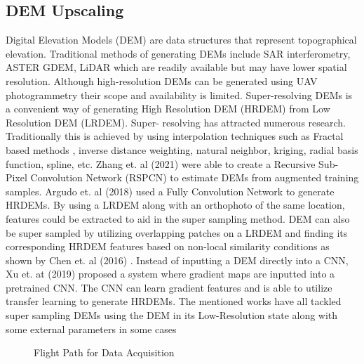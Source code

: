 \documentclass[conference]{IEEEtran}
\begin{document}
\subsection{DEM Upscaling}
Digital Elevation Models (DEM) are data structures that
represent topographical elevation. Traditional methods of
generating DEMs include SAR interferometry, ASTER
GDEM, LiDAR which are readily available but may have
lower spatial resolution. Although high-resolution DEMs
can be generated using UAV photogrammetry their scope
and availability is limited. Super-resolving DEMs is a
convenient way of generating High Resolution DEM
(HRDEM) from Low Resolution DEM (LRDEM). Super-
resolving has attracted numerous research. Traditionally this
is achieved by using interpolation techniques such as Fractal
based methods \cite{322050}, inverse distance weighting, natural
neighbor, kriging, radial basis function, spline, etc. Zhang
et. al (2021) \cite{ijgi10080501} were able to create a Recursive Sub-Pixel
Convolution Network (RSPCN) to estimate DEMs from
augmented training samples. Argudo et. al (2018) \cite{argudo2018} used a Fully Convolution Network to generate HRDEMs. By using
a LRDEM along with an orthophoto of the same location,
features could be extracted to aid in the super sampling
method. DEM can also be super sampled by utilizing
overlapping patches on a LRDEM and finding its
corresponding HRDEM features based on non-local
similarity conditions as shown by Chen et. al (2016) \cite{chen2016}.
Instead of inputting a DEM directly into a CNN, Xu et. at
(2019) \cite{XU201980} proposed a system where gradient maps are
inputted into a pretrained CNN. The CNN can learn gradient
features and is able to utilize transfer learning to generate
HRDEMs. The mentioned works have all tackled super
sampling DEMs using the DEM in its Low-Resolution state
along with some external parameters in some cases


\begin{figure}[htbp]
    \caption{Flight Path for Data Acquisition}
    \label{flightpath}
\end{figure}
\end{document}
